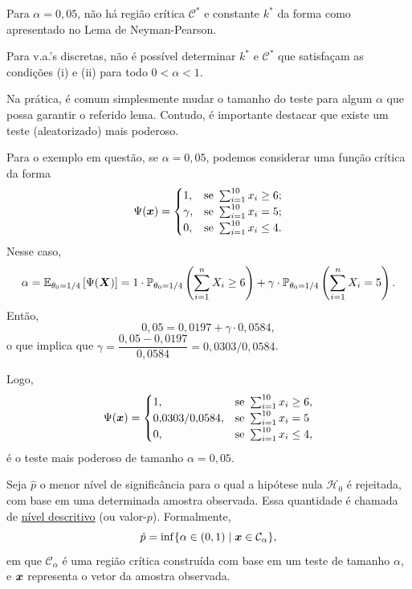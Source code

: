 \begin{example}
Para $\alpha=0{,}05$, não há região crítica $\mathcal{C}^*$ e constante $k^*$ da forma como apresentado no Lema de Neyman-Pearson.

Para v.a.'s discretas, não é possível determinar $k^*$ e $\mathcal{C}^*$ que satisfaçam as condições (i) e (ii) para todo $0<\alpha<1$.

Na prática, é comum simplesmente mudar o tamanho do teste para algum $\alpha$ que possa garantir o referido lema. Contudo, é importante destacar que existe um teste (aleatorizado) mais poderoso.

Para o exemplo em questão, se $\alpha=0{,}05$, podemos considerar uma função crítica da forma
\begin{equation}
\Psi(\bm{x})=
\begin{cases}
1, & \text{se }\sum_{i=1}^{10}x_i\geq6;\\
\gamma, & \text{se }\sum_{i=1}^{10}x_i=5;\\
0, & \text{se }\sum_{i=1}^{10}x_i\leq4.
\end{cases}
\end{equation}
Nesse caso,
\begin{equation}
\alpha=\operatorname{\mathbb{E}}_{\theta_0=1/4}\left[\Psi(\bm{X})\right]=1\cdot\mathbb{P}_{\theta_0=1/4}\left(\sum_{i=1}^n X_i\geq6\right)+\gamma\cdot\mathbb{P}_{\theta_0=1/4}\left(\sum_{i=1}^n X_i=5\right).
\end{equation}
Então,
\begin{equation}
0{,}05=0{,}0197+\gamma\cdot0{,}0584,
\end{equation}
o que implica que $\gamma=\dfrac{0{,}05-0{,}0197}{0{,}0584}=0{,}0303/0{,}0584$.

Logo,
\begin{equation}
\Psi(\bm{x})=
\begin{cases}
1, & \text{se }\sum_{i=1}^{10}x_i\geq6,\\
0{,}0303/0{,}0584, & \text{se }\sum_{i=1}^{10}x_i=5\\
0, & \text{se }\sum_{i=1}^{10}x_i\leq4,
\end{cases}
\end{equation}
é o teste mais poderoso de tamanho $\alpha=0{,}05$.
\end{example}

\begin{definition}
Seja $\hat{p}$ o menor nível de significância para o qual a hipótese nula $\mathcal{H}_0$ é rejeitada, com base em uma determinada amostra observada. Essa quantidade é chamada de \uline{nível descritivo} (ou valor-$p$). Formalmente,
\begin{equation}
\hat{p}=\inf\{\alpha\in(0,1)\mid\bm{x}\in\mathcal{C}_\alpha\},
\end{equation}
em que $\mathcal{C}_\alpha$ é uma região crítica construída com base em um teste de tamanho $\alpha$, e $\bm{x}$ representa o vetor da amostra observada.
\end{definition}

